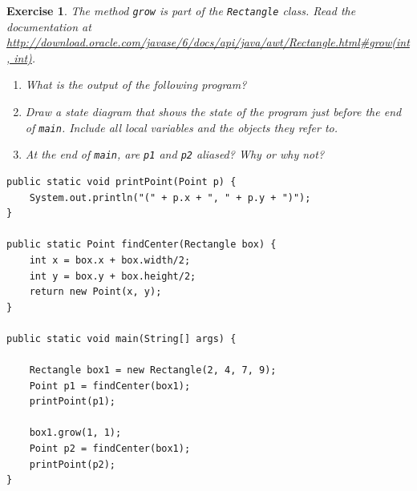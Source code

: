 \documentclass[12pt]{book}
\theoremstyle{exercise}
\newtheorem{exercise}{Exercise}[chapter]
\begin{document}
\begin{exercise}
The method {\tt grow} is part of the {\tt Rectangle} class.  Read the
documentation at
\url{http://download.oracle.com/javase/6/docs/api/java/awt/Rectangle.html#grow(int, int)}.

\begin{enumerate}

\item What is the output of the following program?

\item Draw a state diagram that shows the state of the
program just before the end of {\tt main}.
Include all local variables and the objects
they refer to.

\item At the end of {\tt main}, are {\tt p1} and
{\tt p2} aliased?  Why or why not?

\end{enumerate}

\begin{lstlisting}
public static void printPoint(Point p) {
    System.out.println("(" + p.x + ", " + p.y + ")");
}

public static Point findCenter(Rectangle box) {
    int x = box.x + box.width/2;
    int y = box.y + box.height/2;
    return new Point(x, y);
}

public static void main(String[] args) {

    Rectangle box1 = new Rectangle(2, 4, 7, 9);
    Point p1 = findCenter(box1);
    printPoint(p1);

    box1.grow(1, 1);
    Point p2 = findCenter(box1);
    printPoint(p2);
}
\end{lstlisting}

\end{exercise}
\end{document}
